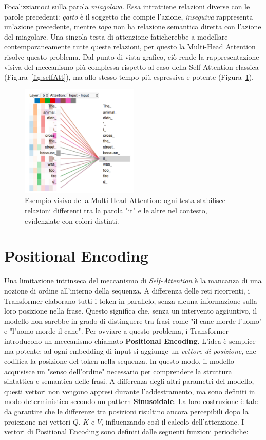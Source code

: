 Focalizziamoci sulla parola \textit{miagolava}. Essa intrattiene relazioni diverse con le parole precedenti: \textit{gatto} è il soggetto che compie l’azione, \textit{inseguiva} rappresenta un’azione precedente, mentre \textit{topo} non ha relazione semantica diretta con l’azione del miagolare. Una singola testa di attenzione faticherebbe a modellare contemporaneamente tutte queste relazioni, per questo la Multi-Head Attention risolve questo problema. Dal punto di vista grafico, ciò rende la rappresentazione visiva del meccanismo più complessa rispetto al caso della Self-Attention classica (Figura~\ref{fig:selfAtt}), ma allo stesso tempo più espressiva e potente (Figura~\ref{fig:multiHeadAtt}).

\begin{figure}
    \centering
    \includegraphics[width=0.5\textwidth]{figure/MultiHeadAttention}
    \caption{Esempio visivo della Multi-Head Attention: ogni testa stabilisce relazioni differenti tra la parola "it" e le altre nel contesto, evidenziate con colori distinti.}
    \label{fig:multiHeadAtt}
\end{figure}

\section{Positional Encoding}

Una limitazione intrinseca del meccanismo di \textit{Self-Attention} è la mancanza di una nozione di ordine all'interno della sequenza.  
A differenza delle reti ricorrenti, i Transformer elaborano tutti i token in parallelo, senza alcuna informazione sulla loro posizione nella frase. Questo significa che, senza un intervento aggiuntivo, il modello non sarebbe in grado di distinguere tra frasi come "il cane morde l’uomo" e "l’uomo morde il cane". Per ovviare a questo problema, i Transformer introducono un meccanismo chiamato \textbf{Positional Encoding}. L’idea è semplice ma potente: ad ogni embedding di input si aggiunge un \textit{vettore di posizione}, che codifica la posizione del token nella sequenza. In questo modo, il modello acquisisce un "senso dell’ordine" necessario per comprendere la struttura sintattica e semantica delle frasi. A differenza degli altri parametri del modello, questi vettori non vengono appresi durante l’addestramento, ma sono definiti in modo deterministico secondo un pattern \textbf{Sinusoidale}. La loro costruzione è tale da garantire che le differenze tra posizioni risultino ancora percepibili dopo la proiezione nei vettori $Q$, $K$ e $V$, influenzando così il calcolo dell’attenzione. I vettori di Positional Encoding sono definiti dalle seguenti funzioni periodiche:

